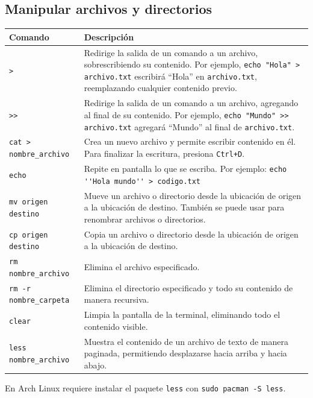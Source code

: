 \subsection{Manipular archivos y directorios}

\begin{center}
\renewcommand{\arraystretch}{1.3}
\begin{tabular}{|p{5.5cm}|p{9.5cm}|}
\hline
\textbf{Comando} & \textbf{Descripción} \\ \hline
\lstinline!>! & Redirige la salida de un comando a un archivo, sobrescribiendo su contenido. Por ejemplo, \lstinline!echo "Hola" > archivo.txt! escribirá ``Hola'' en \lstinline!archivo.txt!, reemplazando cualquier contenido previo. \\ \hline
\lstinline!>>! & Redirige la salida de un comando a un archivo, agregando al final de su contenido. Por ejemplo, \lstinline!echo "Mundo" >> archivo.txt! agregará ``Mundo'' al final de \lstinline!archivo.txt!. \\ \hline 
\lstinline!cat > nombre_archivo! & Crea un nuevo archivo y permite escribir contenido en él. Para finalizar la escritura, presiona \texttt{Ctrl+D}. \\ \hline
\lstinline!echo! & Repite en pantalla lo que se escriba. Por ejemplo: \lstinline!echo ''Hola mundo'' > codigo.txt!  \\ \hline
\lstinline!mv origen destino! & Mueve un archivo o directorio desde la ubicación de origen a la ubicación de destino. También se puede usar para renombrar archivos o directorios. \\ \hline
\lstinline!cp origen destino! & Copia un archivo o directorio desde la ubicación de origen a la ubicación de destino. \\ \hline
\lstinline!rm nombre_archivo! & Elimina el archivo especificado. \\ \hline
\lstinline!rm -r nombre_carpeta! & Elimina el directorio especificado y todo su contenido de manera recursiva. \\ \hline
\lstinline!clear! & Limpia la pantalla de la terminal, eliminando todo el contenido visible. \\ \hline
\lstinline!less nombre_archivo! & Muestra el contenido de un archivo de texto de manera paginada, permitiendo desplazarse hacia arriba y hacia abajo. \\ \hline
\end{tabular}
\end{center}

\begin{nota}[]
    En Arch Linux requiere instalar el paquete \texttt{less} con \texttt{sudo pacman -S less}.
\end{nota}

